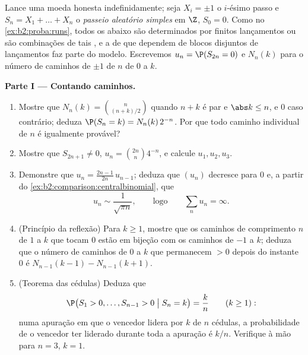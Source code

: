 \begin{problem}\label{pb:b2:proba:1}
Lance uma moeda honesta indefinidamente; seja $X_i = \pm1$ o $i$-ésimo passo
e $S_n = X_1 + \dots + X_n$ o \emph{passeio aleatório
simples} em $\Z$, $S_0 = 0$. Como no
\cref{ex:b2:proba:runs}, todos os  abaixo são determinados por
finitos lançamentos ou são combinações  de tais
, e a  de  que dependem de blocos
disjuntos de lançamentos faz parte do modelo. Escrevemos $u_n =
\P(S_{2n} = 0)$ e $N_n(k)$ para o número de caminhos de $\pm1$
de  $n$ de $0$ a $k$.

\medskip
\noindent\textbf{Parte I --- Contando caminhos.}
\begin{enumerate}
  \item Mostre que $N_n(k) = \binom{n}{(n+k)/2}$ quando $n + k$
        é par e $\abs k \leq n$, e $0$ caso contrário; deduza
        $\P(S_n = k) = N_n(k)\,2^{-n}$. Por que todo
        caminho individual de  $n$ é igualmente provável?
  \item Mostre que $S_{2n+1} \neq 0$, $u_n =
        \binom{2n}{n}4^{-n}$, e calcule $u_1, u_2, u_3$.
  \item Demonstre que $u_n = \frac{2n-1}{2n}\,u_{n-1}$; deduza que
        $(u_n)$ decresce para $0$ e, a partir do
        \cref{ex:b2:comparison:centralbinomial}, que
        \[
        u_n \sim \frac{1}{\sqrt{\pi n}},
        \qquad\text{logo}\qquad
        \sum_n u_n = \infty .
        \]
  \item (Princípio da reflexão) Para $k \geq 1$, mostre que os
        caminhos de comprimento $n$ de $1$ a $k$ que tocam $0$
        estão em bijeção com os caminhos de $-1$ a $k$;
        deduza que o número de caminhos de $0$ a $k$ que
        permanecem $> 0$ depois do instante $0$ é $N_{n-1}(k-1) -
        N_{n-1}(k+1)$.
  \item (Teorema das cédulas) Deduza que
        \[
        \P\bigl(S_1 > 0, \dots, S_{n-1} > 0 \bigm| S_n =
        k\bigr) = \frac kn \qquad (k \geq 1) :
        \]
        numa apuração em que o vencedor lidera por $k$ de $n$
        cédulas, a probabilidade de o vencedor ter liderado durante
        toda a apuração é $k/n$. Verifique à mão para $n = 3$, $k =
        1$.
\end{enumerate}


\end{problem}
